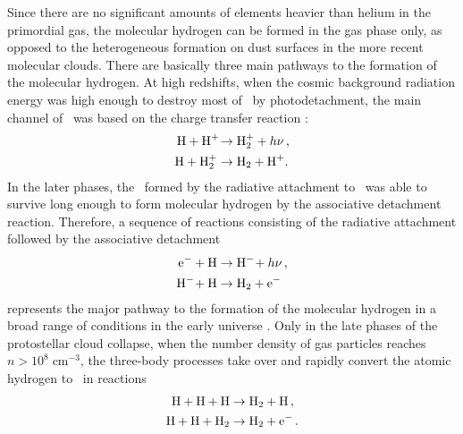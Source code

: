 Since there are no significant amounts of elements heavier than helium in
the primordial gas, the molecular hydrogen can be formed in the gas phase
only, as opposed to the heterogeneous formation on dust surfaces in the more
recent molecular clouds. There are basically three main pathways to the
formation of the molecular hydrogen. At high redshifts, when the cosmic
background radiation energy was high enough to destroy most of \Hminus\ by
photodetachment, the main channel of \Htwo\ was based on the
charge transfer reaction \citep{glover2006}:
\begin{align}
    {\ensuremath{\text{H}}} + {\text{H}^+\!} &\to {\ensuremath{\text{H}}}_2^+ + h\nu\,,\\
    {\text{H}} + {\text{H}}_2^+ &\to {\ensuremath{\text{H}}}_2 + {\text{H}^+\!}\,.
\end{align}
In the later phases, the \Hminus\ formed by the radiative attachment to \hydrogen\
was able to survive long enough to form molecular hydrogen by the associative
detachment reaction. Therefore, a sequence of reactions consisting of the radiative
attachment followed by the associative detachment
\begin{align}
    {\ensuremath{\text{e}^-}} + {\text{H}} &\to {\ensuremath{\text{H}^-\!}} + h\nu\,,\\
    {\text{H}^-\!} + {\text{H}} &\to {\ensuremath{\text{H}}}_2 + {\text{e}^-}\,
    \label{eq:intro:AD}
\end{align}
represents the major pathway to the formation of the molecular hydrogen in a
broad range of conditions in the early
universe \citep{glover2006}. Only in the late phases of the protostellar cloud
collapse, when the number density of gas particles reaches
$n>10^8\;\text{cm}^{-3}$, the three-body processes take over and rapidly
convert the atomic hydrogen to \Htwo\ in reactions \citep{palla1983,turk2011}
\begin{align}
    {\ensuremath{\text{H}}} + {\text{H}} + {\text{H}} &\to {\ensuremath{\text{H}_2}} + {\text{H}}\,,\\
    \label{eq:intro:HHH}
    {\ensuremath{\text{H}}} + {\text{H}} + {\text{H}_2} &\to {\ensuremath{\text{H}}}_2 + {\text{e}^-}\,.
\end{align}

